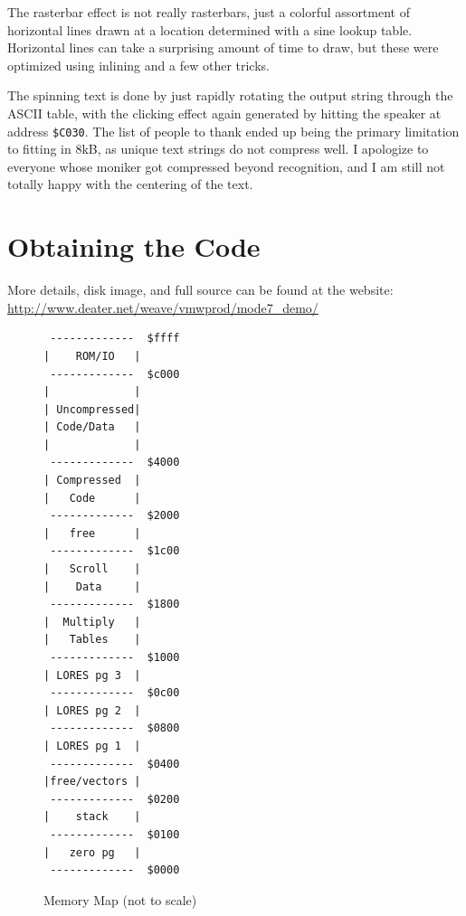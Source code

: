 \documentclass[twocolumn]{article}
\begin{document}
The rasterbar effect is not really rasterbars, just a colorful assortment
of horizontal lines drawn at a location determined with a sine lookup table.
Horizontal lines can take a surprising amount of time to draw, but these
were optimized using inlining and a few other tricks.

The spinning text is done by just rapidly rotating the output string through
the ASCII table, with the clicking effect again generated
by hitting the speaker at address {\tt \$C030}.
The list of people to thank ended up being the primary limitation to
fitting in 8kB, as unique text strings do not compress well.  
I apologize to everyone whose moniker got compressed beyond recognition,
and I am still not totally happy with the centering of the text.

\section{Obtaining the Code}

More details, disk image, and full source can be found at the website:
\url{http://www.deater.net/weave/vmwprod/mode7_demo/}



\begin{figure}
\begin{center}
\begin{scriptsize}
\begin{BVerbatim}
 -------------  $ffff
|    ROM/IO   |
 -------------  $c000
|             |
| Uncompressed|
| Code/Data   |
|             |
 -------------  $4000
| Compressed  |
|   Code      |
 -------------  $2000
|   free      |
 -------------  $1c00
|   Scroll    |
|    Data     |
 -------------  $1800
|  Multiply   |
|   Tables    |	
 -------------  $1000
| LORES pg 3  |
 -------------  $0c00
| LORES pg 2  |
 -------------  $0800
| LORES pg 1  |
 -------------  $0400
|free/vectors |
 -------------  $0200
|    stack    |
 -------------  $0100
|   zero pg   |
 -------------  $0000
\end{BVerbatim}
\end{scriptsize}
\end{center}
\caption{Memory Map (not to scale)\label{fig:map}}
\end{figure}
\end{document}
